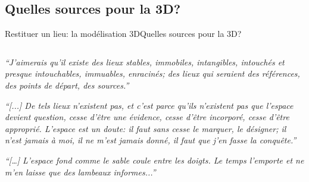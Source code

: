 \documentclass[8pt]{beamer}
\begin{document}
\subsection{Quelles sources pour la 3D?}
\begin{frame}{Restituer un lieu: la modélisation 3D}{Quelles sources pour la 3D?}
	\begin{columns}[c]
		\begin{column}{0.5\textwidth}
			\small
				\textit{\enquote{J'aimerais qu’il existe des lieux stables, immobiles, intangibles, intouchés et presque intouchables, immuables, enracinés; des lieux qui seraient des références, des points de départ, des sources.}}
			
				\textit{\enquote{[...] De tels lieux n’existent pas, et c’est parce qu’ils n'existent pas que l’espace devient question, cesse d’être une évidence, cesse d'être incorporé, cesse d'être approprié. L’espace est un doute: il faut sans cesse le marquer, le désigner; il n’est jamais à moi, il ne m’est jamais donné, il faut que j’en fasse la conquête.}}	
			
				\textit{\enquote{[…] L'espace fond comme le sable coule entre les doigts. Le temps l’emporte et ne m’en laisse que des lambeaux informes...}}
			

\end{column}
\end{columns}
\end{frame}
\end{document}
